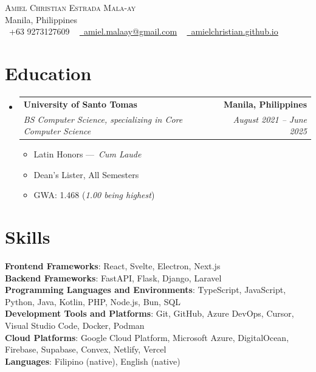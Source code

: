 \documentclass[letterpaper,11pt]{article}
\makeatletter
\newcommand{\resumeItem}[1]{
  \item\small{
    {#1 \vspace{-2pt}}
  }
}
\newcommand{\resumeSubheading}[4]{
  \vspace{-2pt}\item
    \begin{tabular*}{1.0\textwidth}[t]{l@{\extracolsep{\fill}}r}
      \textbf{#1} & \textbf{\small #2} \\
      \textit{\small#3} & \textit{\small #4} \\
    \end{tabular*}\vspace{-7pt}
}
\newcommand{\resumeSubHeadingListStart}{\begin{itemize}[leftmargin=0.0in, label={}]}
\newcommand{\resumeSubHeadingListEnd}{\end{itemize}}
\newcommand{\resumeItemListStart}{\begin{itemize}}
\newcommand{\resumeItemListEnd}{\end{itemize}\vspace{-5pt}}
\makeatother
\begin{document}
\begin{center}
    {\Huge \scshape Amiel Christian Estrada Mala-ay} \\ \vspace{1pt}
    Manila, Philippines \\ \vspace{1pt}
    \small \raisebox{-0.1\height}\faPhone\ +63 9273127609 ~ \href{mailto:amiel.malaay@gmail.com}{\raisebox{-0.2\height}\faEnvelope\  \underline{amiel.malaay@gmail.com}} ~ 
    \href{https://amielchristian.github.io}{\raisebox{-0.2\height}\faGlobe\ \underline{amielchristian.github.io}}
    \vspace{-8pt}
\end{center}

\section{Education}
  \resumeSubHeadingListStart
    \resumeSubheading
      {University of Santo Tomas}{Manila, Philippines}
      {BS Computer Science, specializing in Core Computer Science}{August 2021 -- June 2025}
      \resumeItemListStart
        \resumeItem{Latin Honors —\ \textit{Cum Laude}}
        \resumeItem{Dean's Lister, All Semesters}
        \resumeItem{GWA: 1.468 (\textit{1.00 being highest})}
      \resumeItemListEnd
  \resumeSubHeadingListEnd

\section{Skills}
\begin{itemize}[leftmargin=0.0in, label={}]
   \small{\item{
   \textbf{Frontend Frameworks}{: React, Svelte, Electron, Next.js} \\
   \textbf{Backend Frameworks}{: FastAPI, Flask, Django, Laravel} \\
    \textbf{Programming Languages and Environments}{: TypeScript, JavaScript, Python, Java, Kotlin, PHP, Node.js, Bun, SQL} \\
    \textbf{Development Tools and Platforms}{: Git, GitHub, Azure DevOps, Cursor, Visual Studio Code, Docker, Podman} \\
    \textbf{Cloud Platforms}{: Google Cloud Platform, Microsoft Azure, DigitalOcean, Firebase, Supabase, Convex, Netlify, Vercel} \\
     \textbf{Languages}{: Filipino (native), English (native)}
    }}
 \end{itemize}
\end{document}
